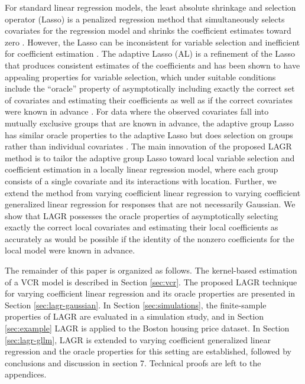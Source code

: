 \documentclass[authoryear,review, 12pt]{elsarticle}
\begin{document}
For standard linear regression models, the least absolute shrinkage
and selection operator (Lasso) is a penalized regression method that
simultaneously selects covariates for the regression model and shrinks
the coefficient estimates toward zero \citep{Tibshirani-1996}. However,
the Lasso can be inconsistent for variable selection and inefficient
for coefficient estimation \citep{Zou-2006}. The adaptive Lasso (AL)
is a refinement of the Lasso that produces consistent estimates of
the coefficients and has been shown to have appealing properties for
variable selection, which under suitable conditions include the ``oracle''
property of asymptotically including exactly the correct set of covariates
and estimating their coefficients as well as if the correct covariates
were known in advance \citep{Zou-2006}. For data where the observed
covariates fall into mutually exclusive groups that are known in advance,
the adaptive group Lasso has similar oracle properties to the adaptive
Lasso but does selection on groups rather than individual covariates
\citep{Yuan-Lin-2006,Wang-Leng-2008}. The main innovation of the
proposed LAGR method is to tailor the adaptive group Lasso toward
local variable selection and coefficient estimation in a locally linear
regression model, where each group consists of a single covariate
and its interactions with location. Further, we extend the method
from varying coefficient linear regression to varying coefficient
generalized linear regression for responses that are not necessarily
Gaussian. We show that LAGR possesses the oracle properties of asymptotically
selecting exactly the correct local covariates and estimating their
local coefficients as accurately as would be possible if the identity
of the nonzero coefficients for the local model were known in advance.

The remainder of this paper is organized as follows. The kernel-based
estimation of a VCR model is described in Section \ref{sec:vcr}.
The proposed LAGR technique for varying coefficient linear regression
and its oracle properties are presented in Section \ref{sec:lagr-gaussian}.
In Section \ref{sec:simulations}, the finite-sample properties of
LAGR are evaluated in a simulation study, and in Section \ref{sec:example}
LAGR is applied to the Boston housing price dataset. In Section \ref{sec:lagr-gllm},
LAGR is extended to varying coefficient generalized linear regression
and the oracle properties for this setting are established, followed
by conclusions and discussion in section 7. Technical proofs are left
to the appendices.
\end{document}
